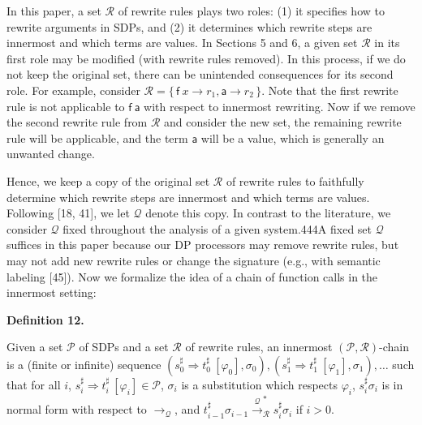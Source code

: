  
  
 
 
 
In this paper, a set $\mathcal{R}$ of rewrite rules plays two roles: (1) it specifies how to rewrite arguments in SDPs, and (2) it determines which rewrite steps are innermost and which terms are values. In Sections 5 and 6, a given set $\mathcal{R}$ in its first role may be modified (with rewrite rules removed). In this process, if we do not keep the original set, there can be unintended consequences for its second role. For example, consider $\mathcal{R}=\{\,{\mathsf{f}}\ {x}\rightarrow r_{1},\mathsf{a}\rightarrow r_{2}\,\}$. Note that the first rewrite rule is not applicable to ${\mathsf{f}}\ {\mathsf{a}}$ with respect to innermost rewriting. Now if we remove the second rewrite rule from $\mathcal{R}$ and consider the new set, the remaining rewrite rule will be applicable, and the term $\mathsf{a}$ will be a value, which is generally an unwanted change.\par
 
 
 
Hence, we keep a copy of the original set $\mathcal{R}$ of rewrite rules to faithfully determine which rewrite steps are innermost and which terms are values. Following [18, 41], we let $\mathcal{Q}$ denote this copy. In contrast to the literature, we consider $\mathcal{Q}$ fixed throughout the analysis of a given system.444A fixed set $\mathcal{Q}$ suffices in this paper because our DP processors may remove rewrite rules, but may not add new rewrite rules or change the signature (e.g., with semantic labeling [45]). Now we formalize the idea of a chain of function calls in the innermost setting:\par
 
 
 
\par\medskip\noindent\textbf{Definition 12.}\par
 
 
Given a set $\mathcal{P}$ of SDPs and a set $\mathcal{R}$ of rewrite rules, an innermost $(\mathcal{P},\mathcal{R})$-chain is a (finite or infinite) sequence $({s_{0}^{\sharp}}\Rightarrow{t_{0}^{\sharp}}\ [\varphi_{0}],\sigma_{0}),({s_{1}^{\sharp}}\Rightarrow{t_{1}^{\sharp}}\ [\varphi_{1}],\sigma_{1}),\ldots$ such that for all $i$, ${s_{i}^{\sharp}}\Rightarrow{t_{i}^{\sharp}}\ [\varphi_{i}]\in\mathcal{P}$, $\sigma_{i}$ is a substitution which respects $\varphi_{i}$, $s_{i}^{\sharp}\sigma_{i}$ is in normal form with respect to $\rightarrow_{\mathcal{Q}}$, and $t_{i-1}^{\sharp}\sigma_{i-1}\xrightarrow{\scriptscriptstyle\mathcal{Q}}_{\mathcal{R}}^{*}s_{i}^{\sharp}\sigma_{i}$ if $i>0$.\par
 
